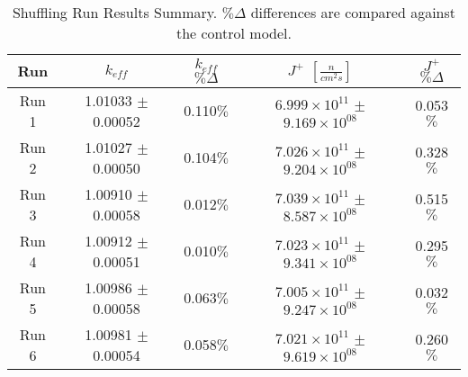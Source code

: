 

\begin{table}[H]
\centering
\caption[Shuffling Run Results Summary]{Shuffling Run Results Summary.  $\%\Delta$ differences are compared against the control model.}
 \begin{tabularx}{0.7\textwidth}{c  c  c  c  c}
 	\hline
 	Run & $k_{eff}$ & $k_{eff}$ $\% \Delta$ & $J^+$  $[\frac{n}{cm^2s}]$ & $J^+$ $\% \Delta$ \\
 	\hline
 	Run 1 & 1.01033 $\pm$ 0.00052 & 0.110$\%$ & $6.999\times10^{11}$ $\pm$ $9.169\times10^{08}$ & 0.053$\%$ \\
 	Run 2 & 1.01027 $\pm$ 0.00050 & 0.104$\%$ & $7.026\times10^{11}$ $\pm$ $9.204\times10^{08}$  & 0.328$\%$ \\
 	Run 3 & 1.00910 $\pm$ 0.00058 & 0.012$\%$ & $7.039\times10^{11}$ $\pm$ $8.587\times10^{08}$ & 0.515$\%$  \\
 	Run 4 & 1.00912 $\pm$ 0.00051 & 0.010$\%$ & $7.023\times10^{11}$ $\pm$ $9.341\times10^{08}$ & 0.295$\%$ \\
 	Run 5 & 1.00986 $\pm$ 0.00058 & 0.063$\%$ & $7.005\times10^{11}$ $\pm$ $9.247\times10^{08}$ & 0.032$\%$  \\
 	Run 6 & 1.00981 $\pm$ 0.00054 & 0.058$\%$ & $7.021\times10^{11}$ $\pm$ $9.619\times10^{08}$ & 0.260$\%$ \\
 	\hline

 \end{tabularx}
\label{table:shufsens}
\end{table}